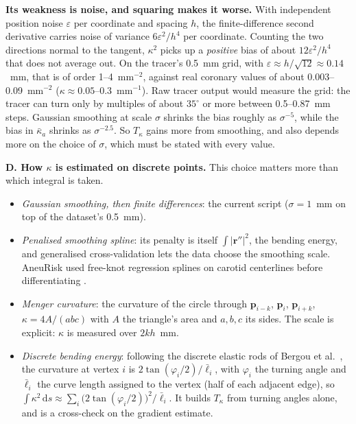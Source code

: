 \textbf{Its weakness is noise, and squaring makes it worse.} With independent position noise
$\varepsilon$ per coordinate and spacing $h$, the finite-difference second derivative carries noise
of variance $6\varepsilon^2/h^4$ per coordinate. Counting the two directions normal to the tangent,
$\kappa^2$ picks up a \emph{positive} bias of about $12\varepsilon^2/h^4$ that does not average
out. On the tracer's 0.5~mm grid, with $\varepsilon \approx h/\sqrt{12} \approx 0.14$~mm, that is of
order 1--4~mm$^{-2}$, against real coronary values of about 0.003--0.09~mm$^{-2}$
($\kappa \approx 0.05$--0.3~mm$^{-1}$). Raw tracer output would measure the grid: the tracer can
turn only by multiples of about $35^\circ$ or more between 0.5--0.87~mm steps. Gaussian smoothing at
scale $\sigma$ shrinks the bias roughly as $\sigma^{-5}$, while the bias in $\bar\kappa_a$ shrinks
as $\sigma^{-2.5}$. So $T_\kappa$ gains more from smoothing, and also depends more on the choice of
$\sigma$, which must be stated with every value.

\textbf{D. How $\kappa$ is estimated on discrete points.} This choice matters more than which
integral is taken.
\begin{itemize}
  \item \emph{Gaussian smoothing, then finite differences}: the current script ($\sigma = 1$~mm on
    top of the dataset's 0.5~mm).
  \item \emph{Penalised smoothing spline}: its penalty is itself $\int\lvert\mathbf r''\rvert^2$,
    the bending energy, and generalised cross-validation lets the data choose the smoothing scale.
    AneuRisk used free-knot regression splines on carotid centerlines before differentiating
    \cite{sangalli2009aneurisk}.
  \item \emph{Menger curvature}: the curvature of the circle through $\mathbf p_{i-k}$,
    $\mathbf p_i$, $\mathbf p_{i+k}$, $\kappa = 4A/(abc)$ with $A$ the triangle's area and $a,b,c$
    its sides. The scale is explicit: $\kappa$ is measured over $2kh$~mm.
  \item \emph{Discrete bending energy}: following the discrete elastic rods of Bergou et al.\
    \cite{bergou2008rods}, the curvature at vertex $i$ is $2\tan(\varphi_i/2)/\bar\ell_i$,
    with $\varphi_i$ the turning angle and $\bar\ell_i$ the curve length assigned to the vertex
    (half of each adjacent edge), so
    $\int\kappa^2\,\mathrm ds \approx \sum_i \bigl(2\tan(\varphi_i/2)\bigr)^2/\bar\ell_i$. It
    builds $T_\kappa$ from turning angles alone, and is a cross-check on the gradient estimate.
\end{itemize}

